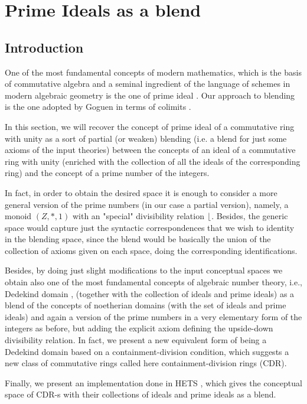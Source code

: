 \section{Prime Ideals as a blend}
\label{sec:prime_ideals}

\subsection*{Introduction}
One of the most fundamental concepts of modern mathematics, which is
the basis of commutative algebra and a seminal ingredient of the
language of schemes in modern algebraic geometry is the one of prime
ideal \parencite{EGAI,eisenbud}. Our approach to blending is the one
adopted by Goguen in terms of
colimits \parencite{Gog99,Goguen01,Goguen05c}.

In this section, we will recover the concept of prime ideal of a
commutative ring with unity as a sort of partial (or weaken) blending
(i.e. a blend for just some axioms of the input theories) between the
concepts of an ideal of a commutative ring with unity (enriched with
the collection of all the ideals of the corresponding ring) and the
concept of a prime number of the integers.

In fact, in order to obtain the desired space it is enough to consider
a more general version of the prime numbers (in our case a partial
version), namely, a monoid $(Z,*,1)$ with an "special" divisibility
relation $\lfloor$. Besides, the generic space would capture just
the syntactic correspondences that we wish to identity in the
blending space, since the blend would be basically the union of the
collection of axioms given on each space, doing the corresponding
identifications.

Besides, by doing just slight modifications to the input conceptual
spaces we obtain also one of the most fundamental concepts of
algebraic number theory, i.e., Dedekind domain \parencite[Theorem
37.1]{colemanmultidealtheory}, (together with the collection of ideals
and prime ideals) as a blend of the concepts of noetherian domains
(with the set of ideals and prime ideals) and again a version of the
prime numbers in a very elementary form of the integers as before, but
adding the explicit axiom defining the upside-down divisibility
relation. In fact, we present a new equivalent form of being a
Dedekind domain based on a containment-division condition, which
suggests a new class of commutative rings called here
containment-division rings (CDR).

Finally, we present an implementation done in HETS
\cite{Mossakowskihets}, which gives the conceptual space of CDR-s with
their collections of ideals and prime ideals as a blend.

